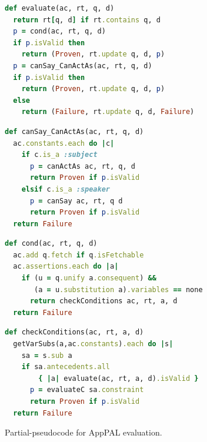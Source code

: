 \documentclass[]{llncs}
\begin{document}
\begin{figure}\centering
\begin{minipage}[b]{0.49\linewidth}
\begin{lstlisting}[language=Ruby, basicstyle=\ttfamily\scriptsize, keywordstyle=\scriptsize\slshape, columns=flexible]
def evaluate(ac, rt, q, d)
  return rt[q, d] if rt.contains q, d
  p = cond(ac, rt, q, d)
  if p.isValid then
    return (Proven, rt.update q, d, p)
  p = canSay_CanActAs(ac, rt, q, d)
  if p.isValid then
    return (Proven, rt.update q, d, p)
  else
    return (Failure, rt.update q, d, Failure)
\end{lstlisting}
\end{minipage}
\begin{minipage}[b]{0.49\linewidth}
\begin{lstlisting}[language=Ruby, basicstyle=\ttfamily\scriptsize, keywordstyle=\scriptsize\slshape, columns=flexible]
def canSay_CanActAs(ac, rt, q, d)
  ac.constants.each do |c|
    if c.is_a :subject
      p = canActAs ac, rt, q, d
      return Proven if p.isValid
    elsif c.is_a :speaker
      p = canSay ac, rt, q d
      return Proven if p.isValid
  return Failure
\end{lstlisting}
\end{minipage}

\begin{minipage}[b]{0.49\linewidth}
\begin{lstlisting}[language=Ruby, basicstyle=\ttfamily\scriptsize, keywordstyle=\scriptsize\slshape, columns=flexible]
def cond(ac, rt, q, d)
  ac.add q.fetch if q.isFetchable
  ac.assertions.each do |a|
    if (u = q.unify a.consequent) &&
       (a = u.substitution a).variables == none
      return checkConditions ac, rt, a, d
  return Failure
\end{lstlisting}
\end{minipage}
\begin{minipage}[b]{0.49\linewidth}
\begin{lstlisting}[language=Ruby, basicstyle=\ttfamily\scriptsize, keywordstyle=\scriptsize\slshape, columns=flexible]
def checkConditions(ac, rt, a, d)
  getVarSubs(a,ac.constants).each do |s|
    sa = s.sub a
    if sa.antecedents.all
        { |a| evaluate(ac, rt, a, d).isValid }
      p = evaluateC sa.constraint
      return Proven if p.isValid
  return Failure
\end{lstlisting}
\end{minipage}
\caption{Partial-pseudocode for AppPAL evaluation.}
\label{fig:pseudocode}
\end{figure}
\end{document}
